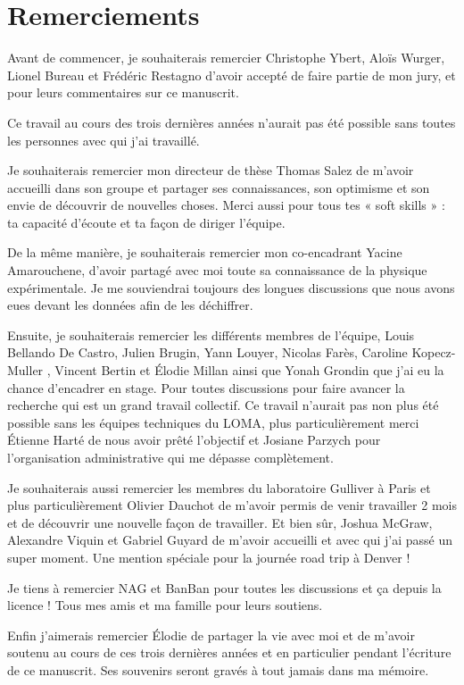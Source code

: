 
\newpage
\section*{Remerciements}
Avant de commencer, je souhaiterais remercier Christophe Ybert, Aloïs Wurger, Lionel Bureau et Frédéric Restagno d’avoir accepté de faire partie de mon jury, et pour leurs commentaires sur ce manuscrit.

Ce travail au cours des trois dernières années n’aurait pas été possible sans toutes les personnes avec qui j’ai travaillé. 

Je souhaiterais remercier mon directeur de thèse Thomas Salez de m’avoir accueilli dans son groupe et partager ses connaissances, son optimisme et son envie de découvrir de nouvelles choses. Merci aussi pour tous tes  « soft skills » : ta capacité d’écoute et ta façon de diriger l’équipe.

De la même manière, je souhaiterais remercier mon co-encadrant Yacine Amarouchene, d’avoir partagé avec moi toute sa connaissance de la physique expérimentale. Je me souviendrai toujours des longues discussions que nous avons eues devant les données afin de les déchiffrer. 

Ensuite, je souhaiterais remercier les différents membres de l’équipe, Louis Bellando De Castro, Julien Brugin, Yann Louyer, Nicolas Farès, Caroline Kopecz-Muller , Vincent Bertin et Élodie Millan ainsi que Yonah Grondin que j’ai eu la chance d’encadrer en stage. Pour toutes discussions pour faire avancer la recherche qui est un grand travail collectif. Ce travail n’aurait pas non plus été possible sans les équipes techniques du LOMA, plus particulièrement merci Étienne Harté de nous avoir prêté l’objectif et Josiane Parzych pour l’organisation administrative qui me dépasse complètement.

Je souhaiterais aussi remercier les membres du laboratoire Gulliver à Paris et plus particulièrement Olivier Dauchot de m’avoir permis de venir travailler 2 mois et de découvrir une nouvelle façon de travailler. Et bien sûr, Joshua McGraw, Alexandre Viquin et Gabriel Guyard de m’avoir accueilli et avec qui j’ai passé un super moment. Une mention spéciale pour la journée road trip à Denver !



Je tiens à remercier NAG et BanBan pour toutes les discussions et ça depuis la licence ! Tous mes amis et ma famille pour leurs soutiens.

Enfin j’aimerais remercier Élodie de partager la vie avec moi et de m’avoir soutenu au cours de ces trois dernières années et en particulier pendant l’écriture de ce manuscrit. Ses souvenirs seront gravés à tout jamais dans ma mémoire.


